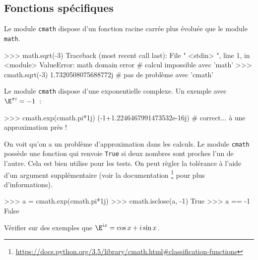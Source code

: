 \subsection{Fonctions spécifiques}

Le module \texttt{cmath} dispose d'un fonction racine carrée  plus évoluée que le module
\texttt{math}.

\begin{pythoncode}
>>> math.sqrt(-3)
Traceback (most recent call last):
  File " <stdin> ", line 1, in <module>
ValueError: math domain error                  # calcul impossible avec 'math'
>>> cmath.sqrt(-3)
1.7320508075688772j                            # pas de problème avec 'cmath'
\end{pythoncode}

Le module \texttt{cmath} dispose d'une exponentielle complexe. Un exemple avec $\E^{\pi i}=-1$~:
\begin{pythoncode}
>>> cmath.exp(cmath.pi*1j)
(-1+1.2246467991473532e-16j)       # correct... à une approximation près !
\end{pythoncode}

On voit qu'on a un problème d'approximation dans les calculs. Le module \texttt{cmath} possède
une fonction  qui renvoie \texttt{True} si deux nombres sont proches l'un
de l'autre. Cela est bien utilise pour les tests. On peut règler la tolérance à l'aide d'un argument
supplémentaire (voir la documentation
\footnote{\url{https://docs.python.org/3.5/library/cmath.html\#classification-functions}}
pour plus d'informations).

\begin{pythoncode}
>>> a = cmath.exp(cmath.pi*1j)
>>> cmath.isclose(a, -1)
True
>>> a == -1
False
\end{pythoncode}

\begin{exercice}
Vérifier sur des exemples que $\E^{ix}=\cos x + i \sin x$.
\end{exercice}
